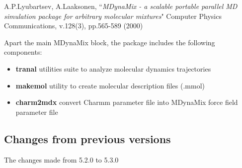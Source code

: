 \documentclass{article}
\begin{document}
A.P.Lyubartsev, A.Laaksonen, ``{\it MDynaMix - a scalable portable parallel MD 
simulation package for arbitrary molecular mixtures}" 
Computer Physics Communications, v.128(3), pp.565-589 (2000)

Apart the main MDynaMix block, the package includes the following
components:

\begin{itemize}
\item
{\bf tranal} utilities suite to analyze molecular dynamics trajectories
\item
{\bf makemol} utility to create molecular description files (.mmol)
\item
{\bf charm2mdx} convert Charmm parameter file into MDynaMix force field
parameter file
\end{itemize}

\subsection{Changes from previous versions}

The changes made from 5.2.0 to 5.3.0
\end{document}
